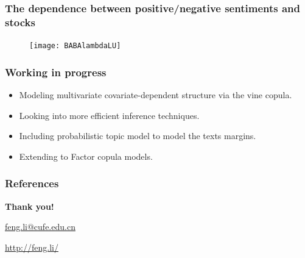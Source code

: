 \documentclass[10pt,aspectratio=169]{beamer}
\begin{document}
\begin{frame}
  \frametitle{The dependence between positive/negative sentiments and stocks}

  \begin{figure}
    \centering
    \texttt{[image: BABAlambdaLU]}
  \end{figure}

\end{frame}
\begin{frame}
  \frametitle{Working in progress }

  \begin{itemize}
  \item Modeling multivariate covariate-dependent structure via the vine copula.
  \item Looking into more efficient inference techniques.
  \item Including probabilistic topic model to model the texts margins.
  \item Extending to Factor copula models.
  \end{itemize}
\end{frame}


\begin{frame}%
  \frametitle{References}
  
  
\end{frame}


\begin{frame}[plain]
  \addtocounter{framenumber}{-1}
  \begin{center}
    {\color{SUblue} \textbf{\Huge Thank you!}}
    \vspace{1cm}

    \url{feng.li@cufe.edu.cn}

    \vspace{1cm}

    \url{http://feng.li/}

  \end{center}
\end{frame}
\end{document}
